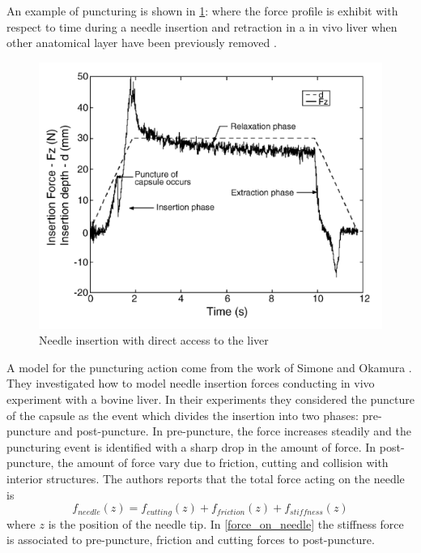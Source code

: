 An example of puncturing is shown in \figurename{ \ref{fig:punct_graph}}: where the force profile is exhibit with respect to time during a needle insertion and retraction in a in vivo liver when other anatomical layer have been previously removed \cite{Maurin2004}.
\begin{figure}
	\includegraphics[width=\textwidth]{images/liver_puncturing.png}
	\caption[A needle insertion]{Needle insertion with direct access to the liver  \cite{Maurin2004}}
	\label{fig:punct_graph}
\end{figure}

A model for the puncturing action come from the work of Simone and Okamura \cite{Simone2002}.
They investigated how to model needle insertion forces conducting in vivo experiment with a bovine liver. In their experiments they considered  the puncture of the capsule as the event which divides the insertion into two phases: pre-puncture and post-puncture. In pre-puncture, the force increases steadily and the puncturing event is identified with a sharp drop in the amount of force. In post-puncture, the amount of force vary due to friction, cutting and collision with interior structures.
The authors reports that the total force acting on the needle is
\begin{equation}\label{force_on_needle}
	f_{needle}\left( z \right)  = f_{cutting}\left(  z \right) + f_{friction}\left( z \right) + f_{stiffness}\left( z \right)
\end{equation}
where $z$ is the position of the needle tip.
In \eqref{force_on_needle} the stiffness force is associated to pre-puncture, friction and cutting forces to post-puncture.

